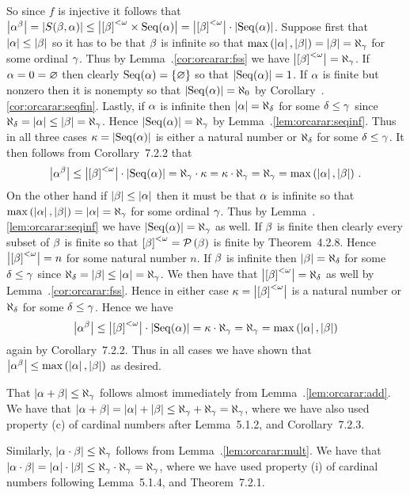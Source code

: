 \begin{solution}
{        So since $f$ is injective it follows that $\abs{\a^\b} = \abs{\sba} \leq \abs{\bfs \times \Seq(\a)} = \abs{\bfs} \cdot \abs{\Seq(\a)}$.
        Suppose first that $\abs{\a} \leq \abs{\b}$ so it has to be that $\b$ is infinite so that $\maxab = \abs{\b} = \al_\g$ for some ordinal $\g$.
        Thus by Lemma~\ex.\ref{cor:orcarar:fss} we have $\abs{\bfs} = \al_\g$.
        If $\a = 0 = \es$ then clearly $\Seq(\a) = \braces{\es}$ so that $\abs{\Seq(\a)} = 1$.
        If $\a$ is finite but nonzero then it is nonempty so that $\abs{\Seq(\a)} = \al_0$ by Corollary~\ex.\ref{cor:orcarar:seqfin}.       Lastly, if $\a$ is infinite then $\abs{\a} = \al_\d$ for some $\d \leq \g$ since $\al_\d = \abs{\a} \leq \abs{\b} = \al_\g$.
        Hence $\abs{\Seq(\a)} = \al_\g$ by Lemma~\ex.\ref{lem:orcarar:seqinf}.
        Thus in all three cases $\k = \abs{\Seq(\a)}$ is either a natural number or $\al_\d$ for some $\d \leq \g$.
        It then follows from Corollary~7.2.2 that
        $$
        \abs{\a^\b} \leq \abs{\bfs} \cdot \abs{\Seq(\a)} = \al_\g \cdot \k = \k \cdot \al_\g = \al_\g = \maxab \,.
        $$
        On the other hand if $\abs{\b} \leq \abs{\a}$ then it must be that $\a$ is infinite so that $\maxab = \abs{\a} = \al_\g$ for some ordinal $\g$.
        Thus by Lemma~\ex.\ref{lem:orcarar:seqinf} we have $\abs{\Seq(\a)} = \al_\g$ as well.
        If $\b$ is finite then clearly every subset of $\b$ is finite so that $\bfs = \pset{\b}$ is finite by Theorem~4.2.8.
        Hence $\abs{\bfs} = n$ for some natural number $n$.
        If $\b$ is infinite then $\abs{\b} = \al_\d$ for some $\d \leq \g$ since $\al_\d = \abs{\b} \leq \abs{\a} = \al_\g$.
        We then have that $\abs{\bfs} = \al_\d$ as well by Lemma~\ex.\ref{cor:orcarar:fss}.
        Hence in either case $\k = \abs{\bfs}$ is a natural number or $\al_\d$ for some $\d \leq \g$.
        Hence we have
        $$
        \abs{\a^\b} \leq \abs{\bfs} \cdot \abs{\Seq(\a)} = \k \cdot \al_\g = \al_\g = \maxab
        $$
        again by Corollary~7.2.2.
        Thus in all cases we have shown that $\abs{\a^\b} \leq \maxab$ as desired. \qedsymbol
    }

    \mainprob

    That $\abs{\a + \b} \leq \al_\g$ follows almost immediately from Lemma~\ex.\ref{lem:orcarar:add}.
    We have that $\abs{\a + \b} = \abs{\a} + \abs{\b} \leq \al_\g + \al_\g = \al_\g$, where we have also used property (c) of cardinal numbers after Lemma~5.1.2, and Corollary~7.2.3.

    Similarly, $\abs{\a \cdot \b} \leq \al_\g$ follows from Lemma~\ex.\ref{lem:orcarar:mult}.
    We have that $\abs{\a \cdot \b} = \abs{\a} \cdot \abs{\b} \leq \al_\g \cdot \al_\g = \al_\g$, where we have used property (i) of cardinal numbers following Lemma~5.1.4, and Theorem~7.2.1.


\end{solution}
